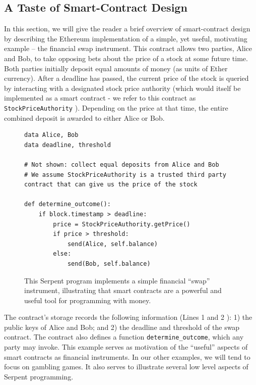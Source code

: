 \documentclass[10pt,twocolumn,letterpaper]{article}
\newcommand{\elaine}[1]{}
\begin{document}
\subsection{A Taste of Smart-Contract Design}

In this section, we will give the reader a brief overview of smart-contract design by describing the Ethereum implementation of a simple, yet useful, motivating example -- the financial swap instrument. This contract allows two parties, Alice and Bob, to take opposing bets about the price of a stock at some future time. Both parties initially deposit equal amounts of money (as units of Ether currency). After a deadline has passed, the current price of the stock is queried by interacting with a designated stock price authority (which would itself be implemented as a smart contract - we refer to this contract as \texttt{StockPriceAuthority} ). Depending on the price at that time, the entire combined deposit is awarded to either Alice or Bob.

\begin{figure}
\begin{mdframed}
\begin{verbatim}
data Alice, Bob
data deadline, threshold

# Not shown: collect equal deposits from Alice and Bob
# We assume StockPriceAuthority is a trusted third party contract that can give us the price of the stock

def determine_outcome():
    if block.timestamp > deadline: 
        price = StockPriceAuthority.getPrice()
        if price > threshold:
            send(Alice, self.balance)
        else:
            send(Bob, self.balance)
\end{verbatim}
\end{mdframed}
\caption{This Serpent program implements a simple financial ``swap'' instrument, illustrating that smart contracts are a powerful and useful tool for programming with money.}
\end{figure}

The contract's storage 
records the following information (Lines 1 and 2 \elaine{hard coded}): 
1) the public keys of Alice and Bob;
and 2) the deadline and threshold 
of the swap contract.
The contract also defines 
a function \texttt{determine\_outcome}, which any party may invoke.
This example serves as motivation of the ``useful'' aspects of smart contracts as financial instruments. In our other examples, we will tend to focus on gambling games. It also serves to illustrate several low level aspects of Serpent programming.
\end{document}
